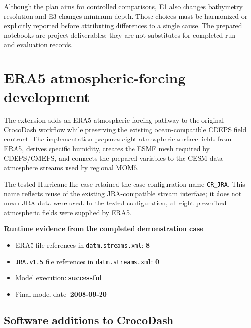 \documentclass[11pt]{article}
\newcommand{\code}[1]{\texttt{#1}}
\begin{document}
Although the plan aims for controlled comparisons, E1 also changes bathymetry resolution and E3 changes minimum depth. Those choices must be harmonized or explicitly reported before attributing differences to a single cause. The prepared notebooks are project deliverables; they are not substitutes for completed run and evaluation records.

\section{ERA5 atmospheric-forcing development}

The extension adds an ERA5 atmospheric-forcing pathway to the original CrocoDash workflow while preserving the existing ocean-compatible CDEPS field contract. The implementation prepares eight atmospheric surface fields from ERA5, derives specific humidity, creates the ESMF mesh required by CDEPS/CMEPS, and connects the prepared variables to the CESM data-atmosphere streams used by regional MOM6.

The tested Hurricane Ike case retained the case configuration name \code{CR\_JRA}. This name reflects reuse of the existing JRA-compatible stream interface; it does not mean JRA data were used. In the tested configuration, all eight prescribed atmospheric fields were supplied by ERA5.

\begin{evidencebox}
\textbf{Runtime evidence from the completed demonstration case}
\begin{itemize}
  \item ERA5 file references in \code{datm.streams.xml}: \textbf{8}
  \item \code{JRA.v1.5} file references in \code{datm.streams.xml}: \textbf{0}
  \item Model execution: \textbf{successful}
  \item Final model date: \textbf{2008-09-20}
\end{itemize}
\end{evidencebox}

\subsection{Software additions to CrocoDash}
\end{document}
